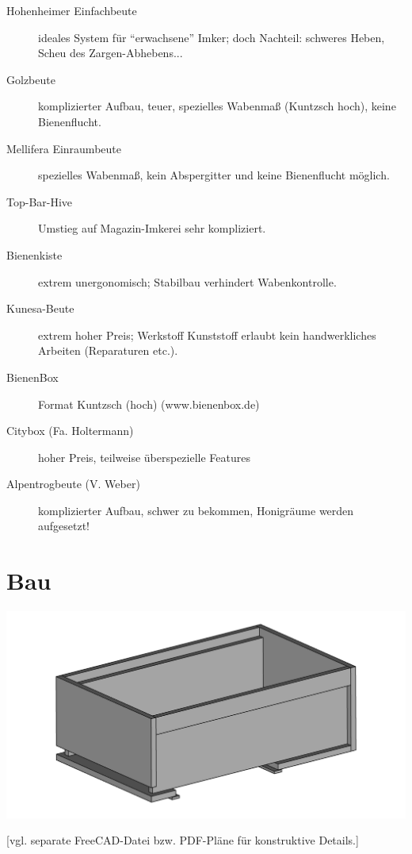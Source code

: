\documentclass[12pt,a4paper,ngerman]{scrartcl}
\begin{document}
\begin{description}
\item[Hohenheimer Einfachbeute] ideales System für \enquote{erwachsene} Imker; doch Nachteil: schweres Heben, Scheu des Zargen-Abhebens...
\item[Golzbeute] komplizierter Aufbau, teuer, spezielles Wabenmaß (Kuntzsch hoch), keine Bienenflucht.
\item[Mellifera Einraumbeute] spezielles Wabenmaß, kein Abspergitter und keine Bienenflucht möglich.
\item[Top-Bar-Hive] Umstieg auf Magazin-Imkerei sehr kompliziert.
\item[Bienenkiste] extrem unergonomisch; Stabilbau verhindert Wabenkontrolle.
\item[Kunesa-Beute] extrem hoher Preis; Werkstoff Kunststoff erlaubt kein handwerkliches Arbeiten (Reparaturen etc.).
\item[BienenBox] Format Kuntzsch (hoch)  (www.bienenbox.de)
\item[Citybox (Fa. Holtermann)] hoher Preis, teilweise überspezielle Features
\item[Alpentrogbeute (V. Weber)] komplizierter Aufbau, schwer zu bekommen, Honigräume werden aufgesetzt!
\end{description}


\section{Bau}


\includegraphics[width=\textwidth]{ansicht1}

\begin{center}
  [vgl. separate FreeCAD-Datei bzw. PDF-Pläne für konstruktive Details.]
\end{center}
\end{document}
